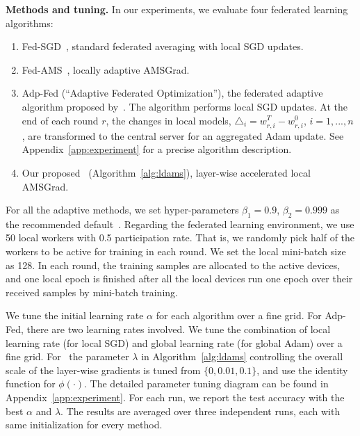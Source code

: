 \documentclass[manuscript,screen,review]{acmart}
\begin{document}
\vspace{0.1in}
\noindent\textbf{Methods and tuning.} In our experiments, we evaluate four federated learning algorithms: 
\begin{enumerate}
    \item Fed-SGD~\citep{mcmahan2017communication}, standard federated averaging with local SGD updates.
    
    \item Fed-AMS~\citep{chen2020toward}, locally adaptive AMSGrad.
    
    \item Adp-Fed (``Adaptive Federated Optimization''), the federated adaptive algorithm proposed by~\cite{reddi2020adaptive}. The algorithm performs local SGD updates. At the end of each round $r$, the changes in local models, $\triangle_i=w_{r,i}^T-w_{r,i}^0$, $i=1,...,n$, are transformed to the central server for an aggregated Adam update. See Appendix~\ref{app:experiment} for a precise algorithm description.
    
    \item Our proposed \algo\ (Algorithm~\ref{alg:ldams}), layer-wise accelerated local AMSGrad.
\end{enumerate}
For all the adaptive methods, we set hyper-parameters $\beta_1=0.9$, $\beta_2=0.999$ as the recommended default~\citep{reddi2019convergence}. Regarding the federated learning environment, we use 50 local workers with 0.5 participation rate. That is, we randomly pick half of the workers to be active for training in each round. We set the local mini-batch size as 128. In each round, the training samples are allocated to the active devices, and one local epoch is finished after all the local devices run one epoch over their received samples by mini-batch training. 

We tune the initial learning rate $\alpha$ for each algorithm over a fine grid. For Adp-Fed, there are two learning rates involved. We tune the combination of local learning rate (for local SGD) and global learning rate (for global Adam) over a fine grid. For \algo\, the parameter $\lambda$ in Algorithm~\ref{alg:ldams} controlling the overall scale of the layer-wise gradients is tuned from $\{0,0.01,0.1\}$, and use the identity function for $\phi(\cdot)$. The detailed parameter tuning diagram can be found in Appendix~\ref{app:experiment}.
For each run, we report the test accuracy with the best $\alpha$ and $\lambda$. The results are averaged over three independent runs, each with same initialization for every method.
\end{document}
